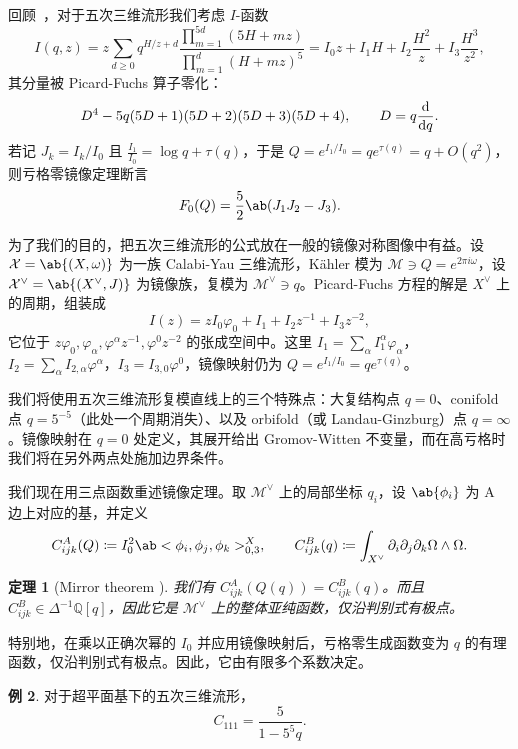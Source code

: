 \documentclass{amsart}
\newtheorem{thm}{定理}[section]
\theoremstyle{definition}
\newtheorem{exm}[thm]{例}
\theoremstyle{remark}
\theoremstyle{plain}
\theoremstyle{definition}
\theoremstyle{remark}
\newcommand{\Q}{\mathbb{Q}}
\newcommand{\mc}[1]{\mathcal{#1}}
\newcommand{\1}{\mathbf{1}}
\newcommand{\2}{\mathbf{2}}
\newcommand{\3}{\mathbf{3}}
\begin{document}
回顾~，对于五次三维流形我们考虑 \(I\)-函数
\[
    I(q,z) = z\sum_{d \geq 0} q^{H/z+d} \frac{\prod_{m=1}^{5d}(5H+mz)}{\prod_{m=1}^d (H+mz)^5} = I_0 z + I_1 H + I_2 \frac{H^2}{z} + I_3 \frac{H^3}{z^2},
\]
其分量被 Picard-Fuchs 算子零化：
\[ D^4 - 5q(5D+1)(5D+2)(5D+3)(5D+4), \qquad D = q \odv{}{q}. \]
若记 \(J_k = I_k/I_0\) 且 \(\frac{I_1}{I_0} = \log q + \tau(q)\)，于是 \(Q = e^{I_1/I_0} = qe^{\tau(q)} = q + O(q^2)\)，则亏格零镜像定理断言
\[ F_0(Q) = \frac{5}{2}\ab(J_1 J_2 - J_3). \]

为了我们的目的，把五次三维流形的公式放在一般的镜像对称图像中有益。设 \(\mc{X} = \ab\{(X,\omega)\}\) 为一族 Calabi-Yau 三维流形，K\"ahler 模为 \(\mc{M} \ni Q = e^{2\pi i \omega}\)，设 \(\mc{X}^{\vee} = \ab\{(X^{\vee},J)\}\) 为镜像族，复模为 \(\mc{M}^{\vee} \ni q\)。Picard-Fuchs 方程的解是 \(X^{\vee}\) 上的周期，组装成
\[ I(z) = zI_0\varphi_0 + I_1 + I_2 z^{-1} + I_3 z^{-2}, \]
它位于 \(z\varphi_0, \varphi_{\alpha}, \varphi^{\alpha}z^{-1}, \varphi^0 z^{-2}\) 的张成空间中。这里 \(I_1 = \sum_{\alpha} I_1^{\alpha}\varphi_{\alpha}\)，\(I_2 = \sum_{\alpha} I_{2,\alpha}\varphi^{\alpha}\)，\(I_3 = I_{3,0}\varphi^0\)，镜像映射仍为 \(Q = e^{I_1/I_0} = qe^{\tau(q)}\)。

我们将使用五次三维流形复模直线上的三个特殊点：大复结构点 \(q=0\)、conifold 点 \(q = 5^{-5}\)（此处一个周期消失）、以及 orbifold（或 Landau-Ginzburg）点 \(q = \infty\)。镜像映射在 \(q=0\) 处定义，其展开给出 Gromov-Witten 不变量，而在高亏格时我们将在另外两点处施加边界条件。

我们现在用三点函数重述镜像定理。取 \(\mc{M}^{\vee}\) 上的局部坐标 \(q_i\)，设 \(\ab\{\phi_i\}\) 为 A 边上对应的基，并定义
\[ C^A_{ijk}(Q) \coloneqq I_0^2 \ab<\phi_i, \phi_j, \phi_k>^X_{0,3}, \qquad C^B_{ijk}(q) \coloneqq \int_{X^{\vee}} \partial_i \partial_j \partial_k \Omega \wedge \Omega. \]

\begin{thm}[Mirror theorem {\cite{Givental1998,LLY1997}}]
    我们有 \(C^A_{ijk}(Q(q)) = C^B_{ijk}(q)\)。而且 \(C^B_{ijk} \in \Delta^{-1}\Q[q]\)，因此它是 \(\mc{M}^{\vee}\) 上的整体亚纯函数，仅沿判别式有极点。
\end{thm}

特别地，在乘以正确次幂的 \(I_0\) 并应用镜像映射后，亏格零生成函数变为 \(q\) 的有理函数，仅沿判别式有极点。因此，它由有限多个系数决定。

\begin{exm}
    对于超平面基下的五次三维流形，
    \[ C_{111} = \frac{5}{1-5^5 q}. \]
\end{exm}
\end{document}
